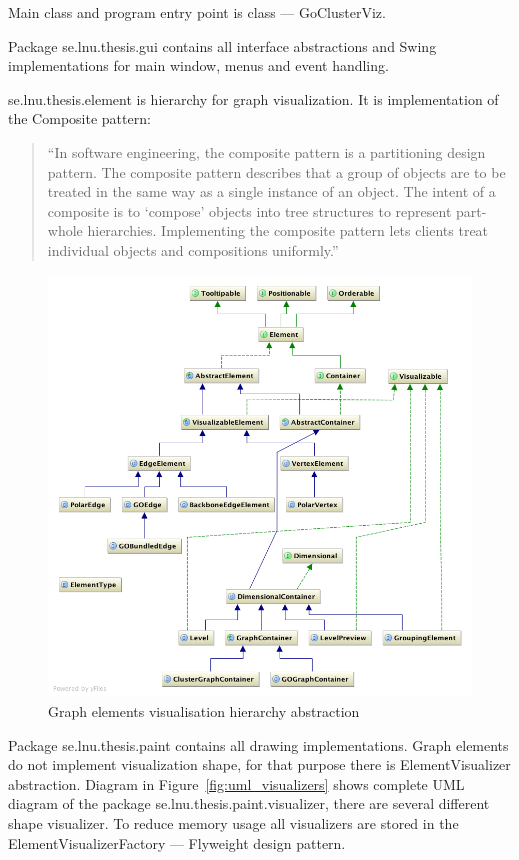 Main class and program entry point is class --- \textsf{GoClusterViz}.

Package \textsf{se.lnu.thesis.gui} contains all interface abstractions and Swing implementations for main window, menus and event handling.

\textsf{se.lnu.thesis.element} is hierarchy for graph visualization. It is implementation of the Composite pattern:

\begin{quotation}
``In software engineering, the composite pattern is a partitioning design pattern.
The composite pattern describes that a group of objects are to be treated in the same way as a single instance of an object.
The intent of a composite is to `compose' objects into tree structures to represent part-whole hierarchies.
Implementing the composite pattern lets clients treat individual objects and compositions uniformly.''~\cite{COMPOSITE_GAMMA}
\end{quotation}

\begin{figure}[h!]
\centering
\includegraphics[scale=0.4]{pictures/uml_elements.png}
\caption{Graph elements visualisation hierarchy abstraction}
\label{fig:uml_elements}
\end{figure}

Package \textsf{se.lnu.thesis.paint} contains all drawing implementations.
Graph elements do not implement visualization shape, for that purpose there is \textsf{ElementVisualizer} abstraction. Diagram in Figure~\ref{fig:uml_visualizers} shows complete UML diagram of the package \textsf{se.lnu.thesis.paint.visualizer}, there are several different shape visualizer. To reduce memory usage all visualizers are stored in the \textsf{ElementVisualizerFactory} --- Flyweight design pattern.

